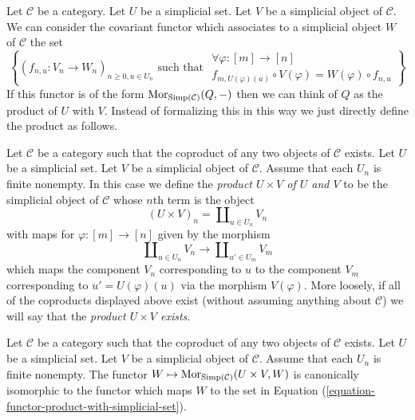 \noindent
Let $\mathcal{C}$ be a category.
Let $U$ be a simplicial set.
Let $V$ be a simplicial object of $\mathcal{C}$.
We can consider the covariant functor which associates
to a simplicial object $W$ of $\mathcal{C}$
the set
\begin{equation}
\label{equation-functor-product-with-simplicial-set}
\left\{
(f_{n, u} : V_n \to W_n)_{n \geq 0, u \in U_n}
\text{ such that }
\begin{matrix}
\forall \varphi : [m] \to [n] \\
f_{m, U(\varphi)(u)} \circ V(\varphi) = W(\varphi) \circ f_{n, u}
\end{matrix}
\right\}
\end{equation}
If this functor is of the form
$\mathop{\mathrm{Mor}}\nolimits_{\text{Simp}(\mathcal{C})}(Q, -)$
then we can think of $Q$ as the product of $U$ with $V$.
Instead of formalizing this in this way we just directly
define the product as follows.

\begin{definition}
\label{definition-product-with-simplicial-set}
Let $\mathcal{C}$ be a category such that the coproduct of
any two objects of $\mathcal{C}$ exists. Let
$U$ be a simplicial set. Let $V$ be a simplicial
object of $\mathcal{C}$. Assume that each $U_n$ is
finite nonempty. In this case we define
the {\it product $U \times V$ of $U$ and $V$}
to be the simplicial object of $\mathcal{C}$ whose
$n$th term is the object
$$
(U \times V)_n = \coprod\nolimits_{u\in U_n} V_n
$$
with maps for $\varphi : [m] \to [n]$ given by the
morphism
$$
\coprod\nolimits_{u\in U_n} V_n
\longrightarrow
\coprod\nolimits_{u'\in U_m} V_m
$$
which maps the component $V_n$ corresponding to $u$ to the
component $V_m$ corresponding to $u' = U(\varphi)(u)$
via the morphism $V(\varphi)$.
More loosely, if all of the coproducts displayed above
exist (without assuming anything about $\mathcal{C}$)
we will say that the {\it product $U \times V$ exists}.
\end{definition}

\begin{lemma}
\label{lemma-check-product-with-simplicial-set}
Let $\mathcal{C}$ be a category such that the coproduct of
any two objects of $\mathcal{C}$ exists. Let
$U$ be a simplicial set. Let $V$ be a simplicial
object of $\mathcal{C}$. Assume that each $U_n$ is
finite nonempty. The functor
$W \mapsto \mathop{\mathrm{Mor}}\nolimits_{\text{Simp}(\mathcal{C})}(U \times V, W)$
is canonically isomorphic to the functor which
maps $W$ to the set in
Equation (\ref{equation-functor-product-with-simplicial-set}).
\end{lemma}

